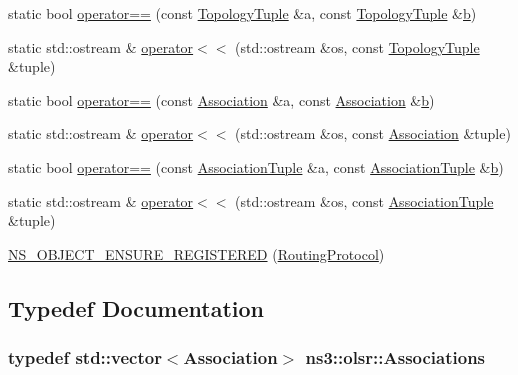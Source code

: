 \begin{DoxyCompactItemize}
\item 
static bool \hyperlink{namespacens3_1_1olsr_a5507536f7356edc181addaaf866399b4}{operator==} (const \hyperlink{structns3_1_1olsr_1_1TopologyTuple}{Topology\+Tuple} \&a, const \hyperlink{structns3_1_1olsr_1_1TopologyTuple}{Topology\+Tuple} \&\hyperlink{lte__pathloss_8m_a21ad0bd836b90d08f4cf640b4c298e7c}{b})
\item 
static std\+::ostream \& \hyperlink{namespacens3_1_1olsr_a0a1ac819b1ff2e5f2df91b9dc561befa}{operator$<$$<$} (std\+::ostream \&os, const \hyperlink{structns3_1_1olsr_1_1TopologyTuple}{Topology\+Tuple} \&tuple)
\item 
static bool \hyperlink{namespacens3_1_1olsr_ac06abdb49923371148c79b2f3b1d343c}{operator==} (const \hyperlink{structns3_1_1olsr_1_1Association}{Association} \&a, const \hyperlink{structns3_1_1olsr_1_1Association}{Association} \&\hyperlink{lte__pathloss_8m_a21ad0bd836b90d08f4cf640b4c298e7c}{b})
\item 
static std\+::ostream \& \hyperlink{namespacens3_1_1olsr_a31338f4dd826a51db9bb65c392ad8464}{operator$<$$<$} (std\+::ostream \&os, const \hyperlink{structns3_1_1olsr_1_1Association}{Association} \&tuple)
\item 
static bool \hyperlink{namespacens3_1_1olsr_afd4fd578dd3936400b3254ce91a17b52}{operator==} (const \hyperlink{structns3_1_1olsr_1_1AssociationTuple}{Association\+Tuple} \&a, const \hyperlink{structns3_1_1olsr_1_1AssociationTuple}{Association\+Tuple} \&\hyperlink{lte__pathloss_8m_a21ad0bd836b90d08f4cf640b4c298e7c}{b})
\item 
static std\+::ostream \& \hyperlink{namespacens3_1_1olsr_a12320c1f6c81056233060ed207033632}{operator$<$$<$} (std\+::ostream \&os, const \hyperlink{structns3_1_1olsr_1_1AssociationTuple}{Association\+Tuple} \&tuple)
\item 
\hyperlink{namespacens3_1_1olsr_adc69ba20cb6650fc9e1659c4d2c074d6}{N\+S\+\_\+\+O\+B\+J\+E\+C\+T\+\_\+\+E\+N\+S\+U\+R\+E\+\_\+\+R\+E\+G\+I\+S\+T\+E\+R\+ED} (\hyperlink{classns3_1_1olsr_1_1RoutingProtocol}{Routing\+Protocol})
\end{DoxyCompactItemize}


\subsection{Typedef Documentation}
\subsubsection[{\texorpdfstring{Associations}{Associations}}]{\setlength{\rightskip}{0pt plus 5cm}typedef std\+::vector$<${\bf Association}$>$ {\bf ns3\+::olsr\+::\+Associations}}\hypertarget{namespacens3_1_1olsr_a7aefab4ffae5b289262125647510a2ef}{}\label{namespacens3_1_1olsr_a7aefab4ffae5b289262125647510a2ef}


